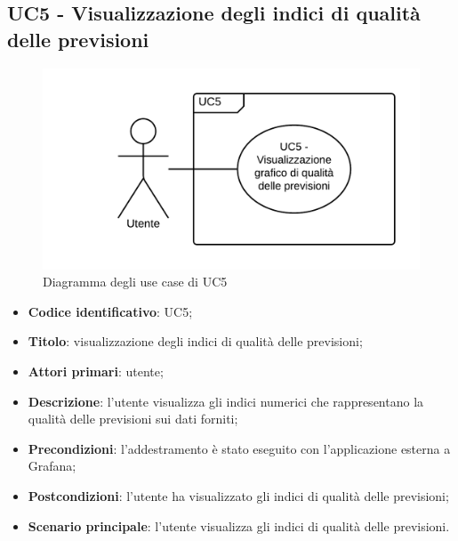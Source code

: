 \subsection{UC5 - Visualizzazione degli indici di qualità delle previsioni}
\begin{figure}[H]
\includegraphics{img/UC5_-_Visualizzazione_grafico_di_qualita_delle_previsioni.png}
\caption{Diagramma degli use case di UC5}
\end{figure}
\begin{itemize}
	\item \textbf{Codice identificativo}: UC5;
	\item \textbf{Titolo}: visualizzazione degli indici di qualità delle previsioni;
	\item \textbf{Attori primari}: utente;
	\item \textbf{Descrizione}: l'utente visualizza gli indici numerici che rappresentano la qualità delle previsioni sui dati forniti;
	\item \textbf{Precondizioni}: l'addestramento è stato eseguito con l'applicazione esterna a Grafana\glo;
	\item \textbf{Postcondizioni}: l'utente ha visualizzato gli indici di qualità delle previsioni;
	\item \textbf{Scenario principale}: l'utente visualizza gli indici di qualità delle previsioni.
\end{itemize} 
